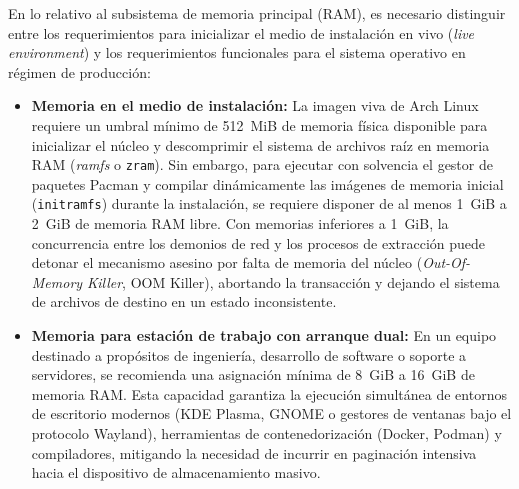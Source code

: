 \documentclass[12pt]{article}
\begin{document}
En lo relativo al subsistema de memoria principal (RAM), es necesario distinguir entre los requerimientos para inicializar el medio de instalación en vivo (\textit{live environment}) y los requerimientos funcionales para el sistema operativo en régimen de producción:
\begin{itemize}[noitemsep, topsep=2pt]
    \item \textbf{Memoria en el medio de instalación:} La imagen viva de Arch Linux requiere un umbral mínimo de 512~MiB de memoria física disponible para inicializar el núcleo y descomprimir el sistema de archivos raíz en memoria RAM (\textit{ramfs} o \texttt{zram}). Sin embargo, para ejecutar con solvencia el gestor de paquetes Pacman y compilar dinámicamente las imágenes de memoria inicial (\texttt{initramfs}) durante la instalación, se requiere disponer de al menos 1~GiB a 2~GiB de memoria RAM libre. Con memorias inferiores a 1~GiB, la concurrencia entre los demonios de red y los procesos de extracción puede detonar el mecanismo asesino por falta de memoria del núcleo (\textit{Out-Of-Memory Killer}, OOM Killer), abortando la transacción y dejando el sistema de archivos de destino en un estado inconsistente.
    \item \textbf{Memoria para estación de trabajo con arranque dual:} En un equipo destinado a propósitos de ingeniería, desarrollo de software o soporte a servidores, se recomienda una asignación mínima de 8~GiB a 16~GiB de memoria RAM. Esta capacidad garantiza la ejecución simultánea de entornos de escritorio modernos (KDE Plasma, GNOME o gestores de ventanas bajo el protocolo Wayland), herramientas de contenedorización (Docker, Podman) y compiladores, mitigando la necesidad de incurrir en paginación intensiva hacia el dispositivo de almacenamiento masivo.
\end{itemize}
\end{document}
